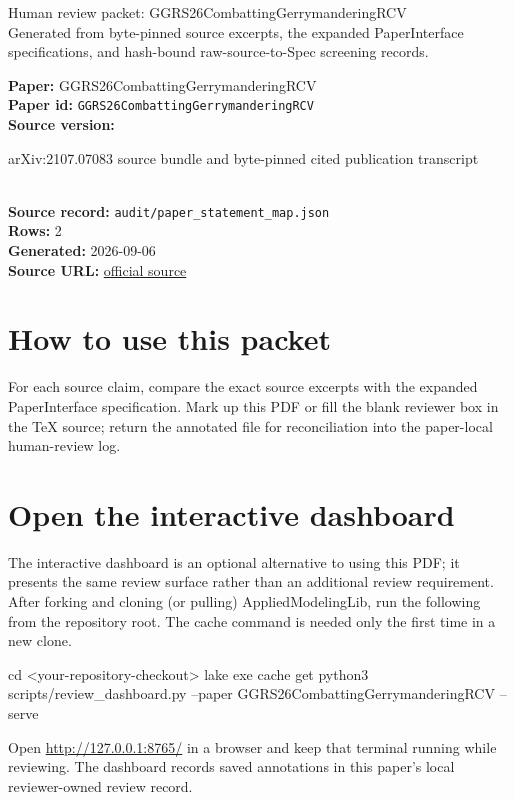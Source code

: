 \documentclass[10pt]{article}
\begin{document}
\fontsize{9}{10}\selectfont

\begin{center}
{\LARGE Human review packet: GGRS26CombattingGerrymanderingRCV}\\[0.35em]
\small Generated from byte-pinned source excerpts, the expanded PaperInterface
specifications, and hash-bound raw-source-to-Spec screening records.
\end{center}

\noindent\textbf{Paper:} GGRS26CombattingGerrymanderingRCV\\
\textbf{Paper id:} \texttt{GGRS26CombattingGerrymanderingRCV}\\
\textbf{Source version:} \parbox[t]{0.76\linewidth}{\raggedright arXiv:2107.07083 source bundle and byte-pinned cited publication transcript}\\
\textbf{Source record:} \texttt{audit/paper\_statement\_map.json}\\
\textbf{Rows:} 2\\
\textbf{Generated:} 2026-09-06\\
\textbf{Source URL:} \href{https://arxiv.org/pdf/2107.07083.pdf}{official source}





\section*{How to use this packet}
For each source claim, compare the exact source excerpts with the expanded
PaperInterface specification. Mark up this PDF or fill the blank reviewer box in the TeX source;
return the annotated file for reconciliation into the paper-local human-review
log.

\section*{Open the interactive dashboard}
The interactive dashboard is an optional alternative to using this PDF; it
presents the same review surface rather than an additional review requirement.
After forking and cloning (or pulling) AppliedModelingLib, run the following from the
repository root. The cache command is needed only the first time in a new clone.
\begin{ReviewVerbatim}
cd <your-repository-checkout>
lake exe cache get
python3 scripts/review_dashboard.py --paper GGRS26CombattingGerrymanderingRCV --serve
\end{ReviewVerbatim}
Open \url{http://127.0.0.1:8765/} in a browser and keep that terminal running
while reviewing. The dashboard records saved annotations in this paper's local
reviewer-owned review record.
\end{document}

